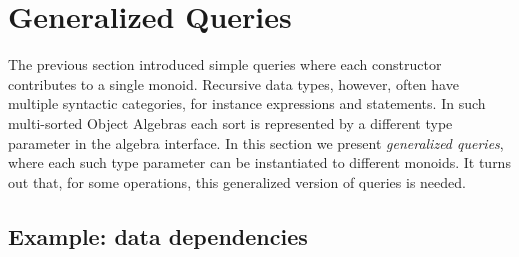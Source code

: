 \section{Generalized Queries}\label{sec:generalizedQueries}

The previous section introduced simple queries where each constructor
contributes to a single monoid.  Recursive data types, however, often
have multiple syntactic categories, for instance expressions and
statements.  In such multi-sorted Object Algebras each sort is
represented by a different type parameter in the algebra interface.
In this section we present \textit{generalized queries}, where each
such type parameter can be instantiated to different monoids.
It turns out that, for some operations, this generalized version 
of queries is needed.

\begin{comment}
\haoyuan{General template. Some redundant texts.}
Figure~\ref{gQueryTemplate} shows the general template for \lstinline{Alg<X1, X2, ..., Xn>}.
Note that interface \lstinline{Alg}$_{GQ}$ extends \lstinline{Alg} and declares one monoid for each sort. As we cannot directly join a monoid over one type with a monoid over another type, for every constructor in \lstinline{Alg}$_{GQ}$, the arguments with different types from its return type are ignored.

\begin{figure}[t]
\begin{lstlisting}[mathescape=true]
interface Alg$_{GQ}$<X$_1$,$...$,X$_n$> extends Alg<X$_1$,$...$,X$_n$> {
  Monoid<X$_1$> m$_1$(); $...$; Monoid<X$_n$> m$_n$();

  default X$_i$ f$_j$(X$^1_p$ p$_1$, $...$, X$^k_p$ p$_k$) {
    X$_i$ res = m$_i$().empty();

    /* For all $s$ such that X$^s_p$ = X$_i$. */
    res = m$_i$().join(res, p$_s$);
    $...$
  }
  $...$
}
\end{lstlisting}
\caption{Generic template for generating boilerplate of generalized queries}
\label{gQueryTemplate}
\end{figure}
\end{comment}


\subsection{Example: data dependencies}
\label{subsec:depGraph}


